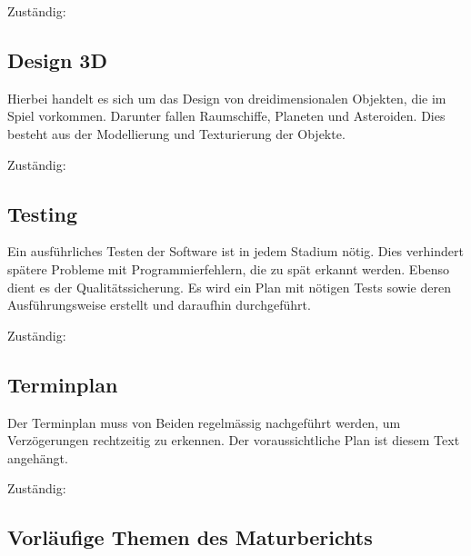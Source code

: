 \documentclass[a4paper]{article}
\begin{document}
Zuständig: 

\subsection{Design 3D}
Hierbei handelt es sich um das Design von dreidimensionalen Objekten, die im Spiel vorkommen. Darunter fallen Raumschiffe, Planeten und Asteroiden. Dies besteht aus der Modellierung und Texturierung der Objekte.

Zuständig: 

\subsection{Testing}
Ein ausführliches Testen der Software ist in jedem Stadium nötig. Dies verhindert spätere Probleme mit Programmierfehlern, die zu spät erkannt werden. Ebenso dient es der Qualitätssicherung. Es wird ein Plan mit nötigen Tests sowie deren Ausführungsweise erstellt und daraufhin durchgeführt.

Zuständig: 

\subsection{Terminplan}
Der Terminplan muss von Beiden regelmässig nachgeführt werden, um Verzögerungen rechtzeitig zu erkennen. Der voraussichtliche Plan ist diesem Text angehängt.

Zuständig:  
\subsection{Vorläufige Themen des Maturberichts}
\end{document}

